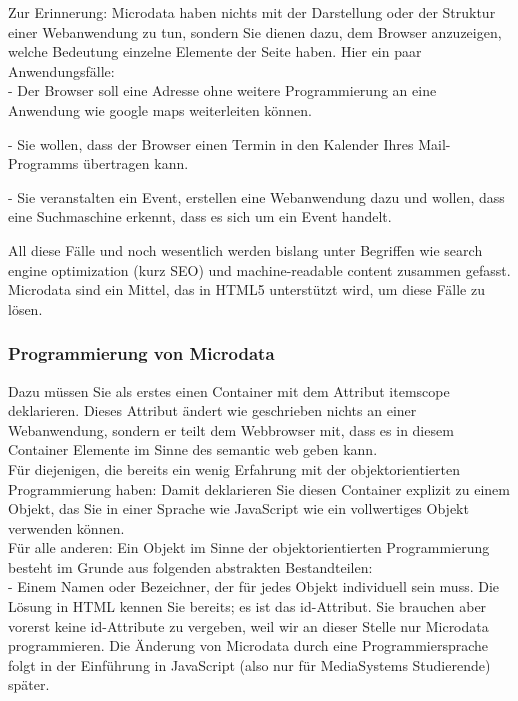 Zur Erinnerung: Microdata haben nichts mit der Darstellung oder der Struktur einer Webanwendung zu tun, sondern Sie dienen dazu, dem Browser anzuzeigen, welche Bedeutung einzelne Elemente der Seite haben. Hier ein paar Anwendungsfälle:\\

-	Der Browser soll eine Adresse ohne weitere Programmierung an eine Anwendung wie google maps weiterleiten können.

-	Sie wollen, dass der Browser einen Termin in den Kalender Ihres Mail-Programms übertragen kann.

-	Sie veranstalten ein Event, erstellen eine Webanwendung dazu und wollen, dass eine Suchmaschine erkennt, dass es sich um ein Event handelt.

All diese Fälle und noch wesentlich werden bislang unter Begriffen wie search engine optimization (kurz SEO) und machine-readable content zusammen gefasst. Microdata sind ein Mittel, das in HTML5 unterstützt wird, um diese Fälle zu lösen.

\subsubsection{Programmierung von Microdata}

Dazu müssen Sie als erstes einen Container mit dem Attribut itemscope deklarieren. Dieses Attribut ändert wie geschrieben nichts an einer Webanwendung, sondern er teilt dem Webbrowser mit, dass es in diesem Container Elemente im Sinne des semantic web geben kann.\\

Für diejenigen, die bereits ein wenig Erfahrung mit der objektorientierten Programmierung haben: Damit deklarieren Sie diesen Container explizit zu einem Objekt, das Sie in einer Sprache wie JavaScript wie ein vollwertiges Objekt verwenden können.\\

Für alle anderen: Ein Objekt im Sinne der objektorientierten Programmierung besteht im Grunde aus folgenden abstrakten Bestandteilen:\\

-	Einem Namen oder Bezeichner, der für jedes Objekt individuell sein muss.
Die Lösung in HTML kennen Sie bereits; es ist das id-Attribut. Sie brauchen aber vorerst keine id-Attribute zu vergeben, weil wir an dieser Stelle nur Microdata programmieren. Die Änderung von Microdata durch eine Programmiersprache folgt in der Einführung in JavaScript (also nur für MediaSystems Studierende) später.

